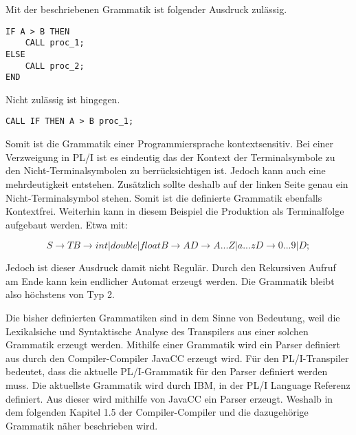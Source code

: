 Mit der beschriebenen Grammatik ist folgender Ausdruck zulässig.

\begin{verbatim}
IF A > B THEN 
	CALL proc_1;
ELSE 
	CALL proc_2;
END
\end{verbatim}

Nicht zulässig ist hingegen.

\begin{verbatim} 
CALL IF THEN A > B proc_1;
\end{verbatim}

Somit ist die Grammatik einer Programmiersprache kontextsensitiv. 
Bei einer Verzweigung in PL/I ist es eindeutig das der Kontext der Terminalsymbole zu den Nicht-Terminalsymbolen zu berrücksichtigen ist. Jedoch kann auch eine mehrdeutigkeit entstehen. Zusätzlich sollte deshalb auf der linken Seite genau ein Nicht-Terminalsymbol stehen. Somit ist die definierte Grammatik ebenfalls Kontextfrei. 
Weiterhin kann in diesem Beispiel die Produktion als Terminalfolge aufgebaut werden. Etwa mit: 

\begin{center}
\begin{equation}
S \to TB \to int | double | float B \to AD \to A...Z|a...z D \to 0...9|D;
\end{equation}
\end{center}

Jedoch ist dieser Ausdruck damit nicht Regulär. Durch den Rekursiven Aufruf am Ende kann kein endlicher Automat erzeugt werden. Die Grammatik bleibt also höchstens von Typ 2.
	
Die bisher definierten Grammatiken sind in dem Sinne von Bedeutung, weil die Lexikalsiche und Syntaktische Analyse des Transpilers aus einer solchen Grammatik erzeugt werden. Mithilfe einer Grammatik wird ein Parser definiert aus durch den Compiler-Compiler JavaCC erzeugt wird. 
Für den PL/I-Transpiler bedeutet, dass die aktuelle PL/I-Grammatik für den Parser definiert werden muss. Die aktuellste Grammatik wird durch IBM, in der PL/I Language Referenz definiert. Aus dieser wird mithilfe von JavaCC ein Parser erzeugt. Weshalb in dem folgenden Kapitel 1.5 der Compiler-Compiler und die dazugehörige Grammatik näher beschrieben wird.

     
